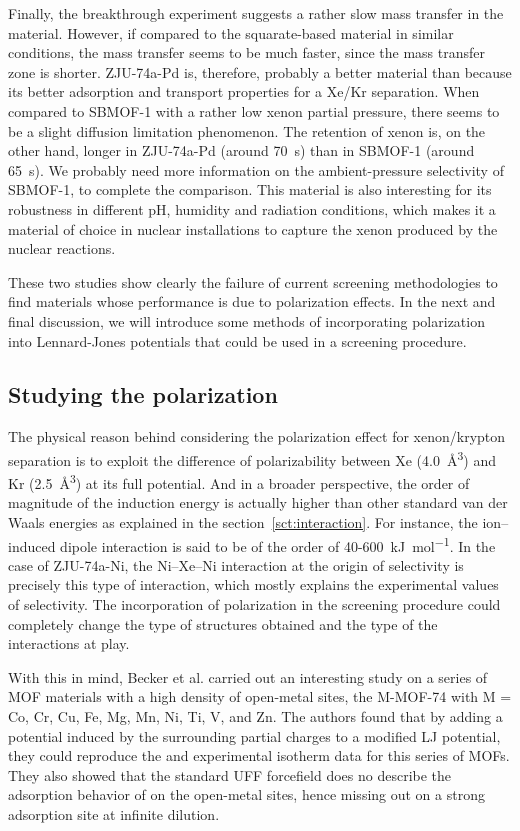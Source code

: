 \documentclass[main]{subfiles}
\begin{document}
Finally, the breakthrough experiment suggests a rather slow mass transfer in the material. However, if compared to the squarate-based material in similar conditions, the mass transfer seems to be much faster, since the mass transfer zone is shorter. ZJU-74a-Pd is, therefore, probably a better material than  because its better adsorption and transport properties for a Xe/Kr separation. When compared to SBMOF-1 with a rather low xenon partial pressure, there seems to be a slight diffusion limitation phenomenon. The retention of xenon is, on the other hand, longer in ZJU-74a-Pd (around \SI{70}{\s}) than in SBMOF-1 (around \SI{65}{\s}). We probably need more information on the ambient-pressure selectivity of SBMOF-1, to complete the comparison.
This material is also interesting for its robustness in different pH, humidity and radiation conditions, which makes it a material of choice in nuclear installations to capture the xenon produced by the nuclear reactions.

These two studies show clearly the failure of current screening methodologies to find materials whose performance is due to polarization effects. In the next and final discussion, we will introduce some methods of incorporating polarization into Lennard-Jones potentials that could be used in a screening procedure.

\subsection{Studying the polarization}

The physical reason behind considering the polarization effect for xenon/krypton separation is to exploit the difference of polarizability between Xe (\SI{4.0}{\cubic\angstrom}) and Kr (\SI{2.5}{\cubic\angstrom})\autocite{Olney1997} at its full potential. And in a broader perspective, the order of magnitude of the induction energy is actually higher than other standard van der Waals energies as explained in the section~\ref{sct:interaction}. For instance, the ion--induced dipole interaction is said to be of the order of 40-600~\si{\kJ\per\mol}. In the case of ZJU-74a-Ni, the Ni--Xe--Ni interaction at the origin of selectivity is precisely this type of interaction, which mostly explains the experimental values of selectivity. The incorporation of polarization in the screening procedure could completely change the type of structures obtained and the type of the interactions at play.

With this in mind, Becker et al. carried out an interesting study on a series of MOF materials with a high density of open-metal sites, the M-MOF-74 with M = Co, Cr, Cu, Fe, Mg, Mn, Ni, Ti, V, and Zn.\autocite{Becker_2017} The authors found that by adding a potential induced by the surrounding partial charges to a modified LJ potential, they could reproduce the  and  experimental isotherm data for this series of MOFs. They also showed that the standard UFF forcefield does no describe the adsorption behavior of  on the open-metal sites, hence missing out on a strong adsorption site at infinite dilution. 
\end{document}
